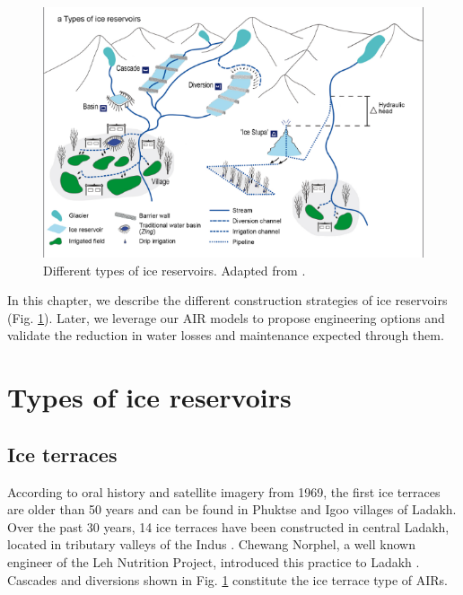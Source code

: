 \begin{figure}[htb]
	\centering
	\includegraphics[width=\textwidth]{figs/AIR_designs}
	\caption{Different types of ice reservoirs. Adapted from \citet{nusserSociohydrologyArtificialGlaciers2019}.}
	\label{fig:AIRdesigns}
\end{figure}

In this chapter, we describe the different construction strategies of ice reservoirs (Fig.
\ref{fig:AIRdesigns}). Later, we leverage our AIR models to propose engineering options and validate the
reduction in water losses and maintenance expected through them.

\section{Types of ice reservoirs}

\subsection{Ice terraces}

According to oral history and satellite imagery from 1969, the first ice terraces are older than 50 years and can
be found in Phuktse and Igoo villages of Ladakh. Over the past 30 years, 14 ice terraces have been constructed in central Ladakh,
located in tributary valleys of the Indus \citep{norphelArtificialGlacierHigh2009,
	nusserSociohydrologyArtificialGlaciers2019}. Chewang Norphel, a well known engineer of the Leh Nutrition
Project, introduced this practice to Ladakh \citep{vinceGlacierMan2009}. Cascades and diversions shown in Fig.
\ref{fig:AIRdesigns} constitute the ice terrace type of AIRs.

